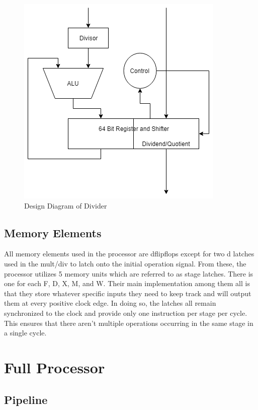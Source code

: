 \documentclass[letterpaper]{article} %
\begin{document}
\begin{figure}[htb!]
    \centering
    \includegraphics[width=.35\textwidth]{dividerDiagram.png}
    \caption{Design Diagram of Divider}
\end{figure}

\subsection*{Memory Elements}

All memory elements used in the processor are dflipflops except for two d latches used in the mult/div to latch onto the initial operation signal. From these, the processor utilizes 5 memory units which are referred to as stage latches. There is one for each F, D, X, M, and W. Their main implementation among them all is that they store whatever specific inputs they need to keep track and will output them at every positive clock edge. In doing so, the latches all remain synchronized to the clock and provide only one instruction per stage per cycle. This ensures that there aren't multiple operations occurring in the same stage in a single cycle.

\section*{Full Processor}

\subsection*{Pipeline}
\end{document}
